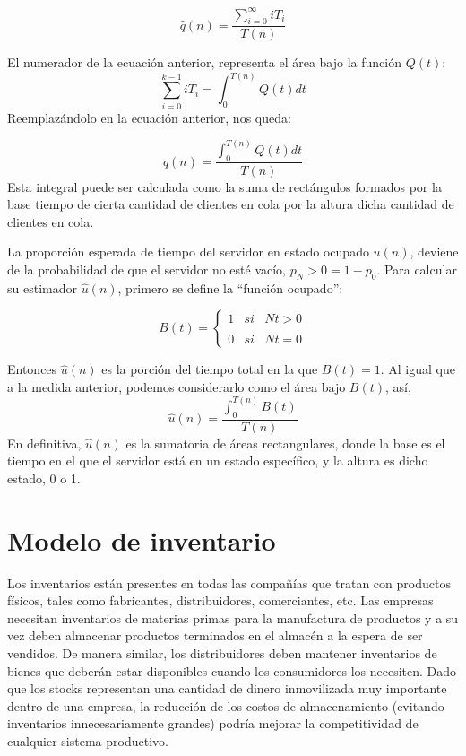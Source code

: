 \begin{equation}
  \label{eq:equation4}
\hat{q}(n)=\frac{\sum_{i=0}^{\infty}iT_{i} }{T(n)}
\end{equation}

El numerador de la ecuación anterior, representa el área bajo la función $Q(t)$:
\begin{equation}
  \label{eq:equation5}
  \sum_{i=0}^{k-1}iT_{i} = \int_{0}^{T(n)}Q(t)dt
\end{equation}
Reemplazándolo en la ecuación anterior, nos queda:

\begin{equation}
  \label{eq:equation6}
  \hat{q}(n)=\frac{\int_{0}^{T(n)}Q(t)dt }{T(n)}
\end{equation}
Esta integral puede ser calculada como la suma de rectángulos formados por la base tiempo de cierta cantidad
de clientes en cola por la altura dicha cantidad de clientes en cola.

La proporción esperada de tiempo del servidor en estado ocupado $u(n)$, deviene de la probabilidad de que
el servidor no esté vacío, $p_{N} > 0 = 1 - p_{0}$. Para calcular su estimador $\hat{u}(n)$, primero se define la ``función
ocupado'':

\begin{equation}\label{eq:equation7}
  B(t) = \left\{ \begin{array}{lcc}
                  1 &   si  & Nt>0  \\
                  \\ 0 &  si  & Nt=0
  \end{array}
  \right.
\end{equation}

Entonces $\hat{u}(n)$ es la porción del tiempo total en la que $B(t) = 1$.
Al igual que a la medida anterior, podemos considerarlo como el área bajo $B(t)$, así,
\begin{equation}\label{eq:equation8}
\hat{u}(n)=\frac{\int_{0}^{T(n)}B(t)}{T(n)}
\end{equation}
En definitiva, $\hat{u}(n)$ es la sumatoria de áreas rectangulares, donde la base es el tiempo en el que el servidor
está en un estado específico, y la altura es dicho estado, 0 o 1.

\section{Modelo de inventario}\label{sec:modelo-m/m/c}
Los inventarios están presentes en todas las compañías que tratan con productos físicos,
tales como fabricantes, distribuidores, comerciantes, etc.
Las empresas necesitan inventarios de materias primas para la manufactura de productos y a su vez
deben almacenar productos terminados en el almacén a la espera de ser vendidos.
De manera similar, los distribuidores deben mantener inventarios de bienes que deberán estar
disponibles cuando los consumidores los necesiten.
Dado que los stocks representan una cantidad de dinero inmovilizada muy importante dentro
de una empresa, la reducción de los costos de almacenamiento (evitando inventarios
innecesariamente grandes) podría mejorar la competitividad de cualquier sistema
productivo.

